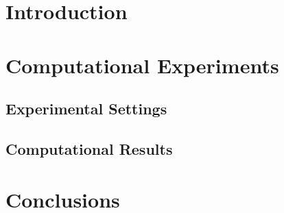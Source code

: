 \documentclass[conference]{IEEEtran}
\begin{document}
\section{Introduction}
% 

\section{Computational Experiments}
% 
\subsection{Experimental Settings}
% 

\subsection{Computational Results}
% 

\section{Conclusions}
% 

 
 
\end{document}
